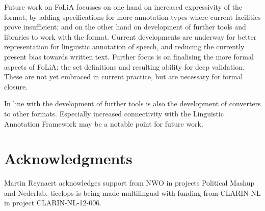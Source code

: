 \documentclass[a4paper,10pt,twoside]{article}
\begin{document}
Future work on FoLiA focusses on one hand on increased expressivity of the
format, by adding specifications for more annotation types where current
facilities prove insufficient; and on the other hand on development of further
tools and libraries to work with the format. Current developments are
underway for better representation for linguistic annotation of speech, and
reducing the currently present bias towards written text. Further focus is on
finalising the more formal aspects of FoLiA; the set definitions and resulting
ability for deep validation. These are not yet embraced in current practice,
but are necessary for formal closure.

In line with the development of further tools is also the development of
converters to other formats. Especially increased connectivity with the
Linguistic Annotation Framework may be a notable point for future work.

\section{Acknowledgments}
Martin Reynaert acknowledges support from NWO in projects Political Mashup and Nederlab.
 {\sc ticcl}ops is being made multilingual with funding from CLARIN-NL in project CLARIN-NL-12-006.
 
  
\end{document}
